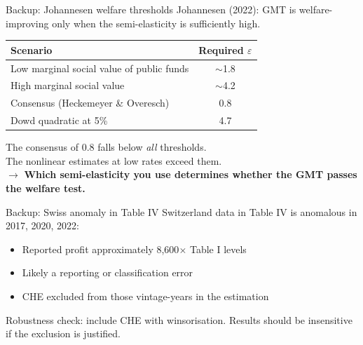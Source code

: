 \documentclass[aspectratio=169, 11pt]{beamer}
\newcommand{\highlight}[1]{\textcolor{DkOrange}{\textbf{#1}}}
\begin{document}
\begin{frame}{Backup: Johannesen welfare thresholds}
Johannesen (2022): GMT is welfare-improving only when the semi-elasticity is sufficiently high.

\vspace{0.5em}
\begin{center}
\small
\begin{tabular}{@{}lc@{}}
  \toprule
  \textbf{Scenario} & \textbf{Required $\varepsilon$} \\
  \midrule
  Low marginal social value of public funds & $\sim$1.8 \\
  High marginal social value & $\sim$4.2 \\
  Consensus (Heckemeyer \& Overesch) & 0.8 \\
  Dowd quadratic at 5\% & 4.7 \\
  \bottomrule
\end{tabular}
\end{center}

\vspace{0.5em}
The consensus of 0.8 falls below \emph{all} thresholds.\\
The nonlinear estimates at low rates exceed them.\\[4pt]
$\to$ \highlight{Which semi-elasticity you use determines whether the GMT passes the welfare test.}
\end{frame}


\begin{frame}{Backup: Swiss anomaly in Table IV}
Switzerland data in Table IV is anomalous in 2017, 2020, 2022:
\begin{itemize}
  \item Reported profit approximately 8,600$\times$ Table I levels
  \item Likely a reporting or classification error
  \item CHE excluded from those vintage-years in the estimation
\end{itemize}

\vspace{0.5em}
Robustness check: include CHE with winsorisation. Results should be insensitive if the exclusion is justified.
\end{frame}
\end{document}
